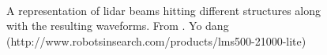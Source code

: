 \begin{figure}[htpb]
    \centering
    \\\vspace{1em}
    \caption{A representation of \gls{lidar} beams hitting different structures along with the resulting waveforms.  From \citet{lidar_figure1}. Yo dang (http://www.robotsinsearch.com/products/lms500-21000-lite) }
    \label{fig:lidar_basics}
\end{figure}

